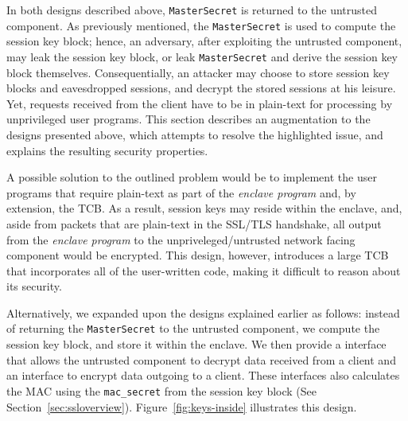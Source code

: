 \documentclass[../../main.tex]{subfiles}
\begin{document}
In both designs described above, \texttt{MasterSecret} is returned to
the untrusted component. As previously mentioned, the
\texttt{MasterSecret} is used to compute the session key block; hence,
an adversary, after exploiting the untrusted component, may leak the
session key block, or leak \texttt{MasterSecret} and derive the
session key block themselves. Consequentially, an attacker may choose
to store session key blocks and eavesdropped sessions, and decrypt the
stored sessions at his leisure. Yet, requests received from the client
have to be in plain-text for processing by unprivileged user programs.
This section describes an augmentation to the designs presented above,
which attempts to resolve the highlighted issue, and explains the
resulting security properties.

A possible solution to the outlined problem would be to implement the
user programs that require plain-text as part of the \textit{enclave
  program} and, by extension, the TCB. As a result, session keys may
reside within the enclave, and, aside from packets that are plain-text
in the SSL/TLS handshake, all output from the \textit{enclave program}
to the unpriveleged/untrusted network facing component would be
encrypted. This design, however, introduces a large TCB that
incorporates all of the user-written code, making it difficult to
reason about its security.

Alternatively, we expanded upon the designs explained earlier as
follows: instead of returning the \texttt{MasterSecret} to the
untrusted component, we compute the session key block, and store it
within the enclave. We then provide a interface that allows the
untrusted component to decrypt data received from a client and an
interface to encrypt data outgoing to a client. These interfaces also
calculates the MAC using the \texttt{mac\_secret} from the session key
block (See Section~\ref{sec:ssloverview}).
Figure~\ref{fig:keys-inside} illustrates this design.
\end{document}
